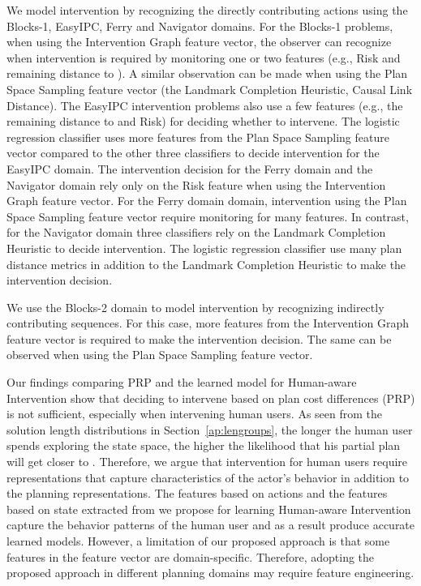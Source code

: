 We model intervention by recognizing the directly contributing actions using the Blocks-1, EasyIPC, Ferry and Navigator domains.
For the Blocks-1 problems, when using the Intervention Graph feature vector, the observer can recognize when intervention is required by monitoring one or two features (e.g., Risk and remaining distance to \undesired). 
A similar observation can be made when using the Plan Space Sampling feature vector (the Landmark Completion Heuristic, Causal Link Distance).
The EasyIPC intervention problems also use a few features (e.g., the remaining distance to \undesired and Risk) for deciding whether to intervene.
The logistic regression classifier uses more features from the Plan Space Sampling feature vector compared to the other three classifiers to decide intervention for the EasyIPC domain.
The intervention decision for the Ferry domain and the Navigator domain rely only on the Risk feature when using the Intervention Graph feature vector.
For the Ferry domain domain, intervention using the Plan Space Sampling feature vector require monitoring for many features.
In contrast, for the Navigator domain three classifiers rely on the Landmark Completion Heuristic to decide intervention. 
The logistic regression classifier use many plan distance metrics in addition to the Landmark Completion Heuristic to make the intervention decision.

We use the Blocks-2 domain to model intervention by recognizing indirectly contributing sequences.
For this case, more features from the Intervention Graph feature vector is required to make the intervention decision. 
The same can be observed when using the Plan Space Sampling feature vector.


Our findings comparing PRP and the learned model for Human-aware Intervention show that deciding to intervene based on plan cost differences (PRP) is not sufficient, especially when intervening human users.
As seen from the solution length distributions in Section~\ref{ap:lengroups}, the longer the human user spends exploring the state space, the higher the likelihood that his partial plan will get closer to \undesired. 
Therefore, we argue that intervention for human users require representations that capture characteristics of the actor's behavior in addition to the planning representations. 
The features based on actions and the features based on state extracted from \historyDef we propose for learning Human-aware Intervention capture the behavior patterns of the human user and as a result produce accurate learned models. 
However, a limitation of our proposed approach is that some features in the feature vector are domain-specific. 
Therefore, adopting the proposed approach in different planning domains may require feature engineering.


